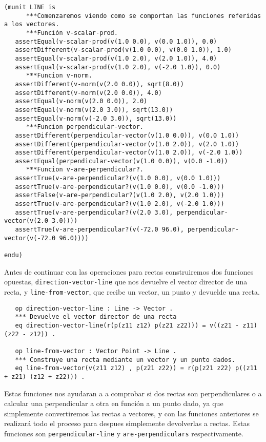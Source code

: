 {\codesize
\begin{verbatim}
(munit LINE is
      ***Comenzaremos viendo como se comportan las funciones referidas a los vectores.
      ***Función v-scalar-prod.
   assertEqual(v-scalar-prod(v(1.0 0.0), v(0.0 1.0)), 0.0)
   assertDifferent(v-scalar-prod(v(1.0 0.0), v(0.0 1.0)), 1.0)
   assertEqual(v-scalar-prod(v(1.0 2.0), v(2.0 1.0)), 4.0)
   assertEqual(v-scalar-prod(v(1.0 2.0), v(-2.0 1.0)), 0.0)		
      ***Funcion v-norm.
   assertDifferent(v-norm(v(2.0 0.0)), sqrt(8.0))
   assertDifferent(v-norm(v(2.0 0.0)), 4.0)
   assertEqual(v-norm(v(2.0 0.0)), 2.0)
   assertEqual(v-norm(v(2.0 3.0)), sqrt(13.0))
   assertEqual(v-norm(v(-2.0 3.0)), sqrt(13.0))
      ***Funcion perpendicular-vector.
   assertDifferent(perpendicular-vector(v(1.0 0.0)), v(0.0 1.0))
   assertDifferent(perpendicular-vector(v(1.0 2.0)), v(2.0 1.0))
   assertDifferent(perpendicular-vector(v(1.0 2.0)), v(-2.0 1.0))
   assertEqual(perpendicular-vector(v(1.0 0.0)), v(0.0 -1.0))
      ***Funcion v-are-perpendicular?.
   assertTrue(v-are-perpendicular?(v(1.0 0.0), v(0.0 1.0)))
   assertTrue(v-are-perpendicular?(v(1.0 0.0), v(0.0 -1.0)))
   assertFalse(v-are-perpendicular?(v(1.0 2.0), v(2.0 1.0)))
   assertTrue(v-are-perpendicular?(v(1.0 2.0), v(-2.0 1.0)))
   assertTrue(v-are-perpendicular?(v(2.0 3.0), perpendicular-vector(v(2.0 3.0))))
   assertTrue(v-are-perpendicular?(v(-72.0 96.0), perpendicular-vector(v(-72.0 96.0))))

endu)
\end{verbatim}
}

Antes de continuar con las operaciones para rectas construiremos dos funciones opuestas, \texttt{direction-vector-line} que nos devuelve el vector director de una recta, y \texttt{line-from-vector}, que recibe un vector, un punto y devuelde una recta. \par
{\codesize
\begin{verbatim}
   op direction-vector-line : Line -> Vector .
   *** Devuelve el vector director de una recta
   eq direction-vector-line(r(p(z11 z12) p(z21 z22))) = v((z21 - z11) (z22 - z12)) .

   op line-from-vector : Vector Point -> Line .
   *** Construye una recta mediante un vector y un punto dados.
   eq line-from-vector(v(z11 z12) , p(z21 z22)) = r(p(z21 z22) p((z11 + z21) (z12 + z22))) .
\end{verbatim}
}

Estas funciones nos ayudaran a a comprobar si dos rectas son perpendiculares o a calcular una perpendicular a otra en función a un punto dado, ya que simplemente convertiremos las rectas a vectores, y con las funciones anteriores se realizará todo el proceso para despues simplemente devolverlas a rectas. Estas funciones son \texttt{perpendicular-line} y \texttt{are-perpendiculars} respectivamente.\par

